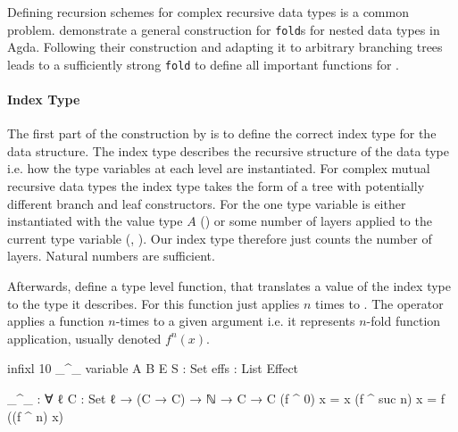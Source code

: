 Defining recursion schemes for complex recursive data types is a common problem.
\textcite{DBLP:journals/corr/abs-1806-05230} demonstrate a general construction
for \texttt{fold}s for nested data types in Agda.
Following their construction and adapting it to arbitrary branching trees leads
to a sufficiently strong \texttt{fold} to define all important functions for
\AgdaSpace{}\AgdaSpace{}.

\paragraph{Index Type} The first part of the construction by
\textcite{DBLP:journals/corr/abs-1806-05230} is to define the correct index type
for the data structure.
The index type describes the recursive structure of the data type i.e. how the
type variables at each level are instantiated.
For complex mutual recursive data types the index type takes the form of a tree
with potentially different branch and leaf constructors.
For \AgdaSpace{}
the one type variable is either instantiated with the value type $A$
() or some number of
\AgdaSpace{} layers applied to
the current type variable (,
).
Our index type therefore just counts the number of
\AgdaSpace{} layers.
Natural numbers are sufficient.

Afterwards, \textcite{DBLP:journals/corr/abs-1806-05230} define a type level
function, that translates a value of the index type to the type it describes.
For
\AgdaSpace{}\AgdaSpace{}
this function just applies \AgdaSpace{}
$n$ times to .
The operator \AgdaFunction{\_\textasciicircum\_} applies a function $n$-times to
a given argument  i.e. it represents $n$-fold function
application, usually denoted $f^n(x)$.

\begin{code}[hide]
infixl 10 _^_
variable
  A B E S : Set
  effs : List Effect
\end{code}
\begin{code}
_^_ : ∀ {ℓ} {C : Set ℓ} → (C → C) → ℕ → C → C
(f ^ 0)      x = x
(f ^ suc n)  x = f ((f ^ n) x)
\end{code}

